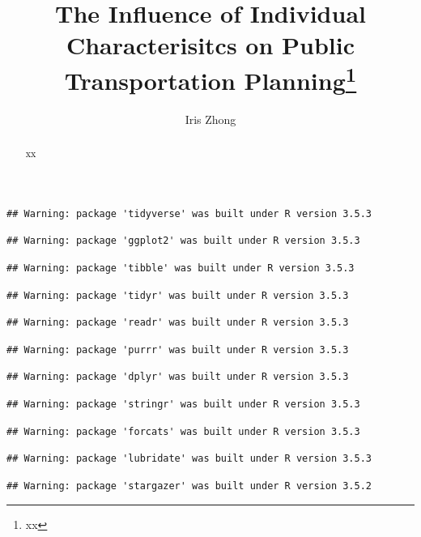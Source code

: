 \documentclass[
]{article}
\title{The Influence of Individual Characterisitcs on Public Transportation
Planning\thanks{xx}}
\author{Iris Zhong}
\date{}
\begin{document}
\maketitle
\begin{abstract}
xx
\end{abstract}

\begin{verbatim}
## Warning: package 'tidyverse' was built under R version 3.5.3
\end{verbatim}

\begin{verbatim}
## Warning: package 'ggplot2' was built under R version 3.5.3
\end{verbatim}

\begin{verbatim}
## Warning: package 'tibble' was built under R version 3.5.3
\end{verbatim}

\begin{verbatim}
## Warning: package 'tidyr' was built under R version 3.5.3
\end{verbatim}

\begin{verbatim}
## Warning: package 'readr' was built under R version 3.5.3
\end{verbatim}

\begin{verbatim}
## Warning: package 'purrr' was built under R version 3.5.3
\end{verbatim}

\begin{verbatim}
## Warning: package 'dplyr' was built under R version 3.5.3
\end{verbatim}

\begin{verbatim}
## Warning: package 'stringr' was built under R version 3.5.3
\end{verbatim}

\begin{verbatim}
## Warning: package 'forcats' was built under R version 3.5.3
\end{verbatim}

\begin{verbatim}
## Warning: package 'lubridate' was built under R version 3.5.3
\end{verbatim}

\begin{verbatim}
## Warning: package 'stargazer' was built under R version 3.5.2
\end{verbatim}
\end{document}
